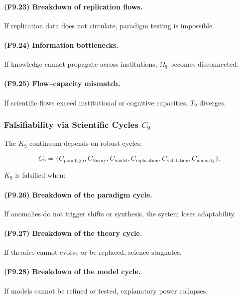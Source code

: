 \paragraph{(F9.23) Breakdown of replication flows.}
If replication data does not circulate,
paradigm testing is impossible.

\paragraph{(F9.24) Information bottlenecks.}
If knowledge cannot propagate across institutions,
$\Omega_9$ becomes disconnected.

\paragraph{(F9.25) Flow–capacity mismatch.}
If scientific flows exceed institutional or cognitive capacities,
$T_9$ diverges.



\subsubsection{Falsifiability via Scientific Cycles \texorpdfstring{$C_9$}{C_9}}

The $K_9$ continuum depends on robust cycles:

\[
C_9 = \{
C_{\mathrm{paradigm}},
C_{\mathrm{theory}},
C_{\mathrm{model}},
C_{\mathrm{replication}},
C_{\mathrm{validation}},
C_{\mathrm{anomaly}}
\}.
\]

$K_9$ is falsified when:

\paragraph{(F9.26) Breakdown of the paradigm cycle.}
If anomalies do not trigger shifts or synthesis,
the system loses adaptability.

\paragraph{(F9.27) Breakdown of the theory cycle.}
If theories cannot evolve or be replaced,
science stagnates.

\paragraph{(F9.28) Breakdown of the model cycle.}
If models cannot be refined or tested,
explanatory power collapses.


